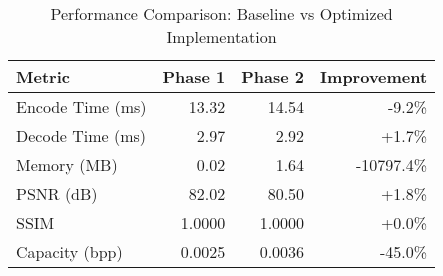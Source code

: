 \begin{table}[htbp]
\centering
\caption{Performance Comparison: Baseline vs Optimized Implementation}
\label{tab:performance}
\begin{tabular}{lrrr}
\hline
\textbf{Metric} & \textbf{Phase 1} & \textbf{Phase 2} & \textbf{Improvement} \\
\hline
Encode Time (ms) & 13.32 & 14.54 & -9.2\% \\
Decode Time (ms) & 2.97 & 2.92 & +1.7\% \\
Memory (MB) & 0.02 & 1.64 & -10797.4\% \\
PSNR (dB) & 82.02 & 80.50 & +1.8\% \\
SSIM & 1.0000 & 1.0000 & +0.0\% \\
Capacity (bpp) & 0.0025 & 0.0036 & -45.0\% \\
\hline
\end{tabular}
\end{table}
